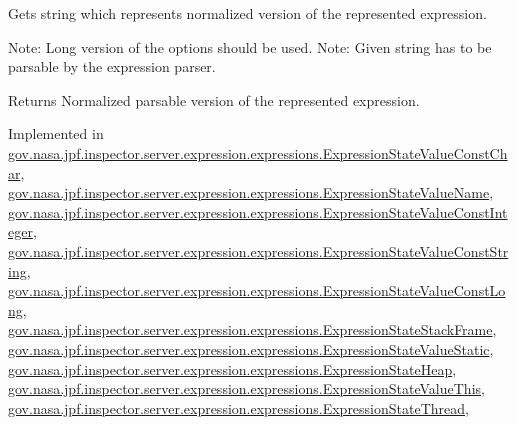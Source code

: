 Gets string which represents normalized version of the represented expression. 

Note\+: Long version of the options should be used. Note\+: Given string has to be parsable by the expression parser.

\begin{DoxyReturn}{Returns}
Normalized parsable version of the represented expression. 
\end{DoxyReturn}


Implemented in \hyperlink{classgov_1_1nasa_1_1jpf_1_1inspector_1_1server_1_1expression_1_1expressions_1_1_expression_state_value_const_char_a8b8dbff87c3f81b9192355201350b701}{gov.\+nasa.\+jpf.\+inspector.\+server.\+expression.\+expressions.\+Expression\+State\+Value\+Const\+Char}, \hyperlink{classgov_1_1nasa_1_1jpf_1_1inspector_1_1server_1_1expression_1_1expressions_1_1_expression_state_value_name_a7dba9eb7d3fe67b1be856b7c890d14fd}{gov.\+nasa.\+jpf.\+inspector.\+server.\+expression.\+expressions.\+Expression\+State\+Value\+Name}, \hyperlink{classgov_1_1nasa_1_1jpf_1_1inspector_1_1server_1_1expression_1_1expressions_1_1_expression_state_value_const_integer_a49ccad06fcf3443c4f1a0306a007f320}{gov.\+nasa.\+jpf.\+inspector.\+server.\+expression.\+expressions.\+Expression\+State\+Value\+Const\+Integer}, \hyperlink{classgov_1_1nasa_1_1jpf_1_1inspector_1_1server_1_1expression_1_1expressions_1_1_expression_state_value_const_string_af7e58cc61aa1cc6e4e6b00f55f18c293}{gov.\+nasa.\+jpf.\+inspector.\+server.\+expression.\+expressions.\+Expression\+State\+Value\+Const\+String}, \hyperlink{classgov_1_1nasa_1_1jpf_1_1inspector_1_1server_1_1expression_1_1expressions_1_1_expression_state_value_const_long_afb79a67f6c4892a3a2660e9ef30926b1}{gov.\+nasa.\+jpf.\+inspector.\+server.\+expression.\+expressions.\+Expression\+State\+Value\+Const\+Long}, \hyperlink{classgov_1_1nasa_1_1jpf_1_1inspector_1_1server_1_1expression_1_1expressions_1_1_expression_state_stack_frame_acb8b5f107d7ebab62db22c7b2a9a91b0}{gov.\+nasa.\+jpf.\+inspector.\+server.\+expression.\+expressions.\+Expression\+State\+Stack\+Frame}, \hyperlink{classgov_1_1nasa_1_1jpf_1_1inspector_1_1server_1_1expression_1_1expressions_1_1_expression_state_value_static_ac8bdf9d1b21b32d12a6e6e5279cc70a6}{gov.\+nasa.\+jpf.\+inspector.\+server.\+expression.\+expressions.\+Expression\+State\+Value\+Static}, \hyperlink{classgov_1_1nasa_1_1jpf_1_1inspector_1_1server_1_1expression_1_1expressions_1_1_expression_state_heap_a1c7afc075a378e4a75dc64441f3d8dcb}{gov.\+nasa.\+jpf.\+inspector.\+server.\+expression.\+expressions.\+Expression\+State\+Heap}, \hyperlink{classgov_1_1nasa_1_1jpf_1_1inspector_1_1server_1_1expression_1_1expressions_1_1_expression_state_value_this_af1b579832ec3891431184154c683194a}{gov.\+nasa.\+jpf.\+inspector.\+server.\+expression.\+expressions.\+Expression\+State\+Value\+This}, \hyperlink{classgov_1_1nasa_1_1jpf_1_1inspector_1_1server_1_1expression_1_1expressions_1_1_expression_state_thread_a8e2420c4821522c88896def518d32f4a}{gov.\+nasa.\+jpf.\+inspector.\+server.\+expression.\+expressions.\+Expression\+State\+Thread}, 